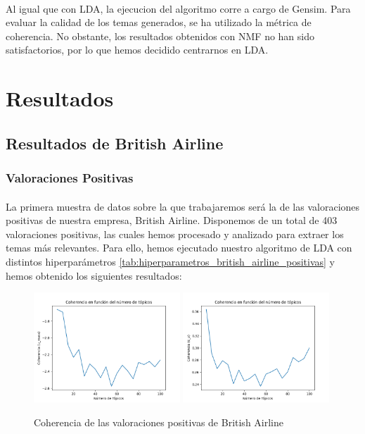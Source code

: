 \documentclass{report}
\begin{document}
{                \paragraph*{}{
                    Al igual que con LDA, la ejecucion del algoritmo corre a cargo de Gensim.
                    Para evaluar la calidad de los temas generados, se ha utilizado la métrica de coherencia.
                    No obstante, los resultados obtenidos con NMF no han sido satisfactorios, por lo que hemos decidido centrarnos en LDA.
                }
        \clearpage\section{Resultados}
            \subsection{Resultados de British Airline}
                \subsubsection*{Valoraciones Positivas}
                    \paragraph*{}{
                        La primera muestra de datos sobre la que trabajaremos será la de las valoraciones positivas de nuestra empresa, British Airline.
                        Disponemos de un total de 403 valoraciones positivas, las cuales hemos procesado y analizado para extraer los temas más relevantes.
                        Para ello, hemos ejecutado nuestro algoritmo de LDA con distintos hiperparámetros \ref{tab:hiperparametros_british_airline_positivas} y hemos obtenido los siguientes resultados: 
                    }
                    \begin{figure}[H]
                        \centering
                        \includegraphics[width=0.49\textwidth]{./img/british_airline_positivas_umass.png}
                        \includegraphics[width=0.49\textwidth]{./img/british_airline_positivas_cv.png}
                        \caption{Coherencia de las valoraciones positivas de British Airline}
                    \end{figure}
}
\end{document}
